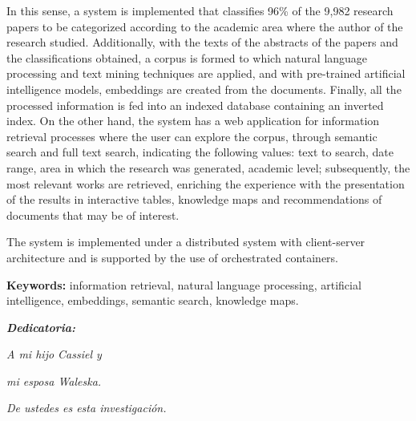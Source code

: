 \documentclass[
  12pt,
  openany]{book}
\begin{document}
In this sense, a system is implemented that classifies 96\% of the 9,982 research papers to be categorized according to the academic area where the author of the research studied. Additionally, with the texts of the abstracts of the papers and the classifications obtained, a corpus is formed to which natural language processing and text mining techniques are applied, and with pre-trained artificial intelligence models, embeddings are created from the documents. Finally, all the processed information is fed into an indexed database containing an inverted index.
On the other hand, the system has a web application for information retrieval processes where the user can explore the corpus, through semantic search and full text search, indicating the following values: text to search, date range, area in which the research was generated, academic level; subsequently, the most relevant works are retrieved, enriching the experience with the presentation of the results in interactive tables, knowledge maps and recommendations of documents that may be of interest.

The system is implemented under a distributed system with client-server architecture and is supported by the use of orchestrated containers.


\vspace*{2cm}

\textbf{Keywords:} information retrieval, natural language processing,  artificial intelligence, embeddings, semantic search, knowledge maps.

\thispagestyle{empty}




\setlength{\abovedisplayskip}{-5pt}
\setlength{\abovedisplayshortskip}{-5pt}
\thispagestyle{empty}

\newpage
\begin{center}
\large{\textbf{\emph{\Huge{Dedicatoria:}}}}
\end{center}
\thispagestyle{empty}
\vspace*{5cm}
\thispagestyle{empty}
\begin{center} \Large \emph{A mi hijo Cassiel y  } \end{center}
\vspace*{1cm}
\begin{center} \Large \emph{mi esposa Waleska.} \end{center}
\vspace*{1cm}
\begin{center} \Large {\emph{De ustedes es esta investigación.}} \end{center}
\end{document}
